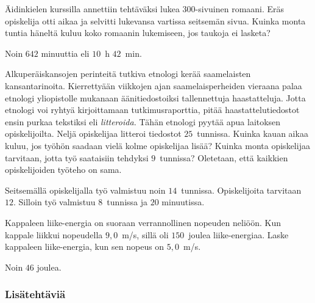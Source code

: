 \begin{tehtavasivu}
\begin{tehtava}
    Äidinkielen kurssilla annettiin tehtäväksi lukea 300-sivuinen romaani.
    Eräs opiskelija otti aikaa ja selvitti lukevansa vartissa seitsemän sivua.
    Kuinka monta tuntia häneltä kuluu koko romaanin lukemiseen, jos
    taukoja ei lasketa?
    
    \begin{vastaus}
        Noin $642$ minuuttia eli $10$~h $42$~min.
    \end{vastaus}
\end{tehtava}

\begin{tehtava}
Alkuperäiskansojen perinteitä tutkiva etnologi kerää saamelaisten kansantarinoita. Kierrettyään viikkojen ajan saamelaisperheiden vieraana palaa etnologi yliopistolle mukanaan äänitiedostoiksi tallennettuja haastatteluja. Jotta etnologi voi ryhtyä kirjoittamaan tutkimusraporttia, pitää haastattelutiedostot ensin purkaa tekstiksi eli \emph{litteroida.} Tähän etnologi pyytää apua laitoksen opiskelijoilta. Neljä opiskelijaa litteroi tiedostot $25$~tunnissa. Kuinka kauan aikaa kuluu, jos työhön saadaan vielä kolme opiskelijaa lisää? Kuinka monta opiskelijaa tarvitaan, jotta työ saataisiin tehdyksi $9$~tunnissa? Oletetaan, että kaikkien opiskelijoiden työteho on sama.

\begin{vastaus}
Seitsemällä opiskelijalla työ valmistuu noin $14$~tunnissa. Opiskelijoita tarvitaan $12$. Silloin työ valmistuu $8$~tunnissa ja $20$ minuutissa. 
\end{vastaus}
\end{tehtava}

\begin{tehtava}
	Kappaleen liike-energia on suoraan verrannollinen nopeuden neliöön.
	Kun kappale liikkui nopeudella $9,0$~m/s, sillä oli $150$~joulea liike-energiaa.
	Laske kappaleen liike-energia, kun sen nopeus on $5,0$~m/s. 
	\begin{vastaus}
		Noin $46$ joulea.
	\end{vastaus}
\end{tehtava}

\subsubsection*{Lisätehtäviä}


\end{tehtavasivu}
